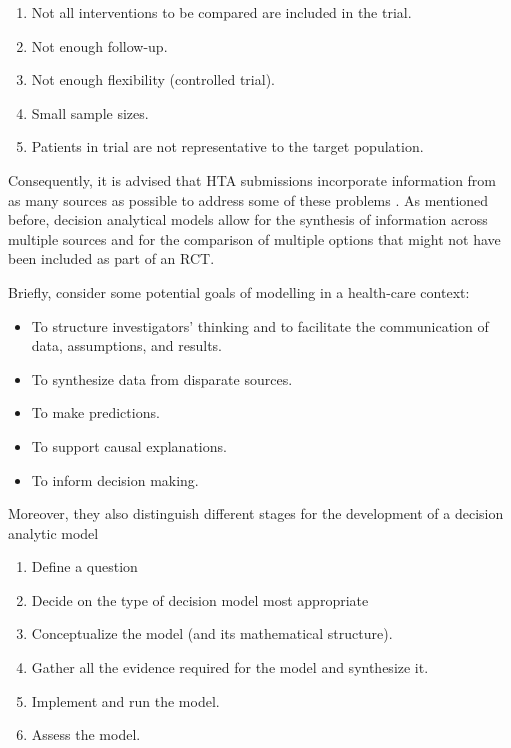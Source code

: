 \documentclass[
]{book}
\providecommand{\tightlist}{%
  \setlength{\itemsep}{0pt}\setlength{\parskip}{0pt}}
\begin{document}
\begin{enumerate}
\def\labelenumi{\arabic{enumi}.}
\tightlist
\item
  Not all interventions to be compared are included in the trial.
\item
  Not enough follow-up.
\item
  Not enough flexibility (controlled trial).
\item
  Small sample sizes.
\item
  Patients in trial are not representative to the target population.
\end{enumerate}

Consequently, it is advised that HTA submissions incorporate information from as many sources as possible to address some of these problems \citep{sculpher2006whither}. As mentioned before, decision analytical models allow for the synthesis of information across multiple sources and for the comparison of multiple options that might not have been included as part of an RCT.

Briefly, \citet{dahabreh2016guidance} consider some potential goals of modelling in a health-care context:

\begin{itemize}
\tightlist
\item
  To structure investigators' thinking and to facilitate the communication of data, assumptions, and results.
\item
  To synthesize data from disparate sources.
\item
  To make predictions.
\item
  To support causal explanations.
\item
  To inform decision making.
\end{itemize}

Moreover, they also distinguish different stages for the development of a decision analytic model

\begin{enumerate}
\def\labelenumi{\arabic{enumi}.}
\tightlist
\item
  Define a question
\item
  Decide on the type of decision model most appropriate
\item
  Conceptualize the model (and its mathematical structure).
\item
  Gather all the evidence required for the model and synthesize it.
\item
  Implement and run the model.
\item
  Assess the model.
\end{enumerate}
\end{document}
